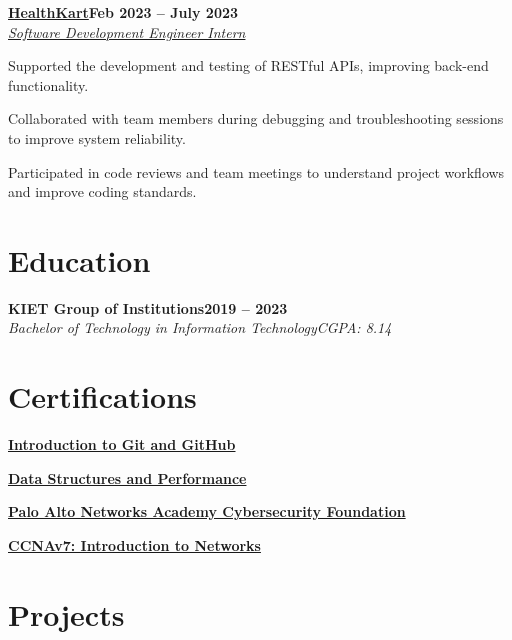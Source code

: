 \documentclass[letterpaper,10pt]{article}
\newcommand{\heading}[2]{
  \hspace{10pt}#1\hfill#2\\
}
\newcommand{\headingBf}[2]{
  \heading{\textbf{#1}}{\textbf{#2}}
}
\newcommand{\headingIt}[2]{
  \heading{\textit{#1}}{\textit{#2}}
}
\newenvironment{resume_list}{
  \vspace{-7pt}
  \begin{itemize}[itemsep=-2px, parsep=1pt, leftmargin=30pt]
}{
  \end{itemize}
}
\begin{document}
\headingBf{\href{https://www.healthcart.com}{HealthKart}}{Feb 2023 -- July 2023} 
\headingIt{\href {https://drive.google.com/file/d/1Iz83NKtrG7A1KG_rK0P8s_sAquzRm_OY/view?usp=sharing}{Software Development Engineer Intern}}{}
\begin{resume_list}
  \item Supported the development and testing of RESTful APIs, improving back-end functionality.
  \item Collaborated with team members during debugging and troubleshooting sessions to improve system reliability.  
  \item Participated in code reviews and team meetings to understand project workflows and improve coding standards.  
\end{resume_list}


\section{Education}

\headingBf{KIET Group of Institutions}{2019 -- 2023}
\headingIt{Bachelor of Technology in Information Technology}{CGPA: 8.14}

\section{Certifications}
\begin{resume_list}  

\item \headingBf{\href {https://www.coursera.org/account/accomplishments/verify/VAXY9EEWXD3C}{Introduction to Git and GitHub}}{}

\item \headingBf{\href {https://www.coursera.org/account/accomplishments/verify/MEHYBBVAYE8E}{Data Structures and Performance}}{}

\item \headingBf{\href {https://www.coursera.org/account/accomplishments/verify/R73VUS4L44RN}{Palo Alto Networks Academy Cybersecurity Foundation}}{}

\item \headingBf{\href {https://drive.google.com/file/d/15n4G1_3d75gbxfikhzodotRZVXInxqhJ/view?usp=sharing}{CCNAv7: Introduction to Networks}}{}
\end{resume_list}

\section{Projects}
\end{document}
